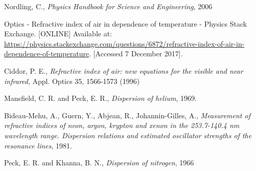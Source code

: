 
\begin{thebibliography}{}

 Nordling, C., \textit{Physics Handbook for Science and Engineering}, 2006

 Optics - Refractive index of air in dependence of temperature - Physics Stack Exchange. [ONLINE] Available at: \url{https://physics.stackexchange.com/questions/6872/refractive-index-of-air-in-dependence-of-temperature}. [Accessed 7 December 2017].

 Ciddor, P. E., \textit{Refractive index of air: new equations for the visible and near infrared}, Appl. Optics 35, 1566-1573 (1996)

 Mansfield, C. R. and Peck, E. R., \textit{Dispersion of helium}, 1969.

 Bideau-Mehu, A., Guern, Y., Abjean, R., Johannin-Gilles, A., \textit{Measurement of refractive indices of neon, argon, krypton and xenon in the 253.7-140.4 nm wavelength range. Dispersion relations and estimated oscillator strengths of the resonance lines}, 1981.

 Peck, E. R. and Khanna, B. N., \textit{Dispersion of nitrogen}, 1966


\end{thebibliography}
